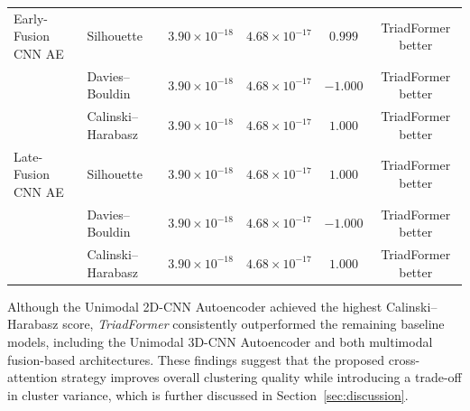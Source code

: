 \documentclass[pdflatex,sn-mathphys-num]{sn-jnl}
\begin{document}
\begin{table}[!t]
{\begin{tabular}{llcccc}
Early-Fusion CNN AE &
Silhouette &
$3.90\times10^{-18}$ &
$4.68\times10^{-17}$ &
$0.999$ &
TriadFormer better \\

&
Davies--Bouldin &
$3.90\times10^{-18}$ &
$4.68\times10^{-17}$ &
$-1.000$ &
TriadFormer better \\

&
Calinski--Harabasz &
$3.90\times10^{-18}$ &
$4.68\times10^{-17}$ &
$1.000$ &
TriadFormer better \\

\midrule

Late-Fusion CNN AE &
Silhouette &
$3.90\times10^{-18}$ &
$4.68\times10^{-17}$ &
$1.000$ &
TriadFormer better \\

&
Davies--Bouldin &
$3.90\times10^{-18}$ &
$4.68\times10^{-17}$ &
$-1.000$ &
TriadFormer better \\

&
Calinski--Harabasz &
$3.90\times10^{-18}$ &
$4.68\times10^{-17}$ &
$1.000$ &
TriadFormer better \\

\bottomrule
\end{tabular}%
}
\end{table}

Although the Unimodal 2D-CNN Autoencoder achieved the highest Calinski--Harabasz score, \textit{TriadFormer} consistently outperformed the remaining baseline models, including the Unimodal 3D-CNN Autoencoder and both multimodal fusion-based architectures. These findings suggest that the proposed cross-attention strategy improves overall clustering quality while introducing a trade-off in cluster variance, which is further discussed in Section~\ref{sec:discussion}.
\end{document}
